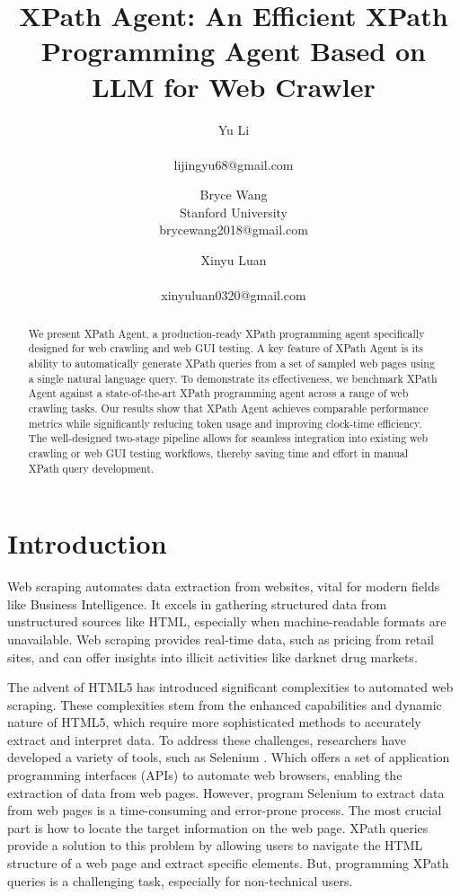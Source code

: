 \documentclass[a4paper]{article}
\title{XPath Agent: An Efficient XPath Programming Agent Based on LLM for Web Crawler}
\author{
Yu Li \\ \\ lijingyu68@gmail.com
\and
Bryce Wang \\ Stanford University  \\ brycewang2018@gmail.com
\and
Xinyu Luan \\ \\ xinyuluan0320@gmail.com
}
\begin{document}
\maketitle

\begin{abstract}
  We present XPath Agent, a production-ready XPath programming agent specifically designed for web crawling and web GUI testing. A key feature of XPath Agent is its ability to automatically generate XPath queries from a set of sampled web pages using a single natural language query. To demonstrate its effectiveness, we benchmark XPath Agent against a state-of-the-art XPath programming agent across a range of web crawling tasks. Our results show that XPath Agent achieves comparable performance metrics while significantly reducing token usage and improving clock-time efficiency. The well-designed two-stage pipeline allows for seamless integration into existing web crawling or web GUI testing workflows, thereby saving time and effort in manual XPath query development.
\end{abstract}

\section{Introduction}

Web scraping \cite{khder2021web} automates data extraction from websites, vital for modern fields like Business Intelligence. It excels in gathering structured data from unstructured sources like HTML, especially when machine-readable formats are unavailable. Web scraping provides real-time data, such as pricing from retail sites, and can offer insights into illicit activities like darknet drug markets.

The advent of HTML5 \cite{TABARES2021101529} has introduced significant complexities to automated web scraping. These complexities stem from the enhanced capabilities and dynamic nature of HTML5, which require more sophisticated methods to accurately extract and interpret data. To address these challenges, researchers have developed a variety of tools, such as Selenium \cite{selenium}. Which offers a set of application programming interfaces (APIs) to automate web browsers, enabling the extraction of data from web pages. However, program Selenium to extract data from web pages is a time-consuming and error-prone process. The most crucial part is how to locate the target information on the web page. XPath queries provide a solution to this problem by allowing users to navigate the HTML structure of a web page and extract specific elements. But, programming XPath queries is a challenging task, especially for non-technical users.
\end{document}
